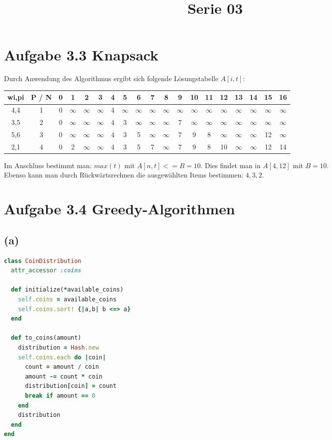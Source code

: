  
\title{Serie 03}

 
\section*{Aufgabe 3.3 Knapsack}

Durch Anwendung des Algorithmus ergibt sich folgende Lösungstabelle $A[i,t]$:\\

\begin{tabular}{ccccccccccccccccccc}
\hline
wi,pi & P / N & 0 & 1 & 2 & 3 & 4 & 5 & 6 & 7 & 8 & 9 & 10 & 11 & 12 & 13 & 14 & 15 & 16\\
\hline
4,4 & 1 & 0 & $\infty$ & $\infty$ & $\infty$ & 4 & $\infty$ & $\infty$ & $\infty$ & $\infty$ & $\infty$ & $\infty$ & $\infty$ & $\infty$ & $\infty$ & $\infty$ & $\infty$ & $\infty$\\
\hline
3,5 & 2 & 0 & $\infty$ & $\infty$ & $\infty$ & 4 & 3 & $\infty$ & $\infty$ & $\infty$ & 7 & $\infty$ & $\infty$ & $\infty$ & $\infty$ & $\infty$ & $\infty$ & $\infty$\\
\hline
5,6 & 3 & 0 & $\infty$ & $\infty$ & $\infty$ & 4 & 3 & 5 & $\infty$ & $\infty$ & 7 & 9 & 8 & $\infty$ & $\infty$ & $\infty$ & 12 & $\infty$\\
\hline
2,1 & 4 & 0 & 2 & $\infty$ & $\infty$ & 4 & 3 & 5 & 7 & $\infty$ & 7 & 9 & 8 & 10 & $\infty$ & $\infty$ & 12 & 14\\
\hline
\end{tabular}

Im Anschluss bestimmt man: $max(t)$ mit $A[n, t] <= B = 10$.
Dies findet man in $A[4,12]$ mit $B = 10$. \\
Ebenso kann man durch Rückwärtsrechnen die ausgewählten Items bestimmen: ${4,3,2}$.

\section*{Aufgabe 3.4 Greedy-Algorithmen}

\subsection*{(a)}

\begin{lstlisting}[language=Ruby,numbers=right]
class CoinDistribution
  attr_accessor :coins
  
  def initialize(*available_coins)
    self.coins = available_coins
    self.coins.sort! {|a,b| b <=> a}
  end
  
  def to_coins(amount)
    distribution = Hash.new
    self.coins.each do |coin|
      count = amount / coin
      amount -= count * coin
      distribution[coin] = count
      break if amount == 0
    end
    distribution
  end
end  
\end{lstlisting}

